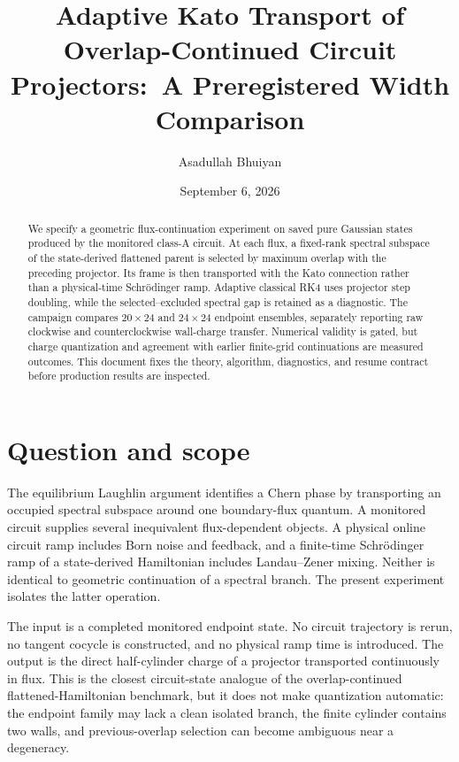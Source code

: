 \documentclass[aps,prb,twocolumn,floatfix,nofootinbib,superscriptaddress]{revtex4-2}
\begin{document}
\title{Adaptive Kato Transport of Overlap-Continued Circuit Projectors:\
A Preregistered Width Comparison}
\author{Asadullah Bhuiyan}
\date{September 6, 2026}

\begin{abstract}
We specify a geometric flux-continuation experiment on saved pure Gaussian
states produced by the monitored class-A circuit.  At each flux, a fixed-rank
spectral subspace of the state-derived flattened parent is selected by maximum
overlap with the preceding projector.  Its frame is then transported with the
Kato connection rather than a physical-time Schr\"odinger ramp.  Adaptive
classical RK4 uses projector step doubling, while the selected--excluded
spectral gap is retained as a diagnostic.  The campaign compares
$20\times24$ and $24\times24$ endpoint ensembles, separately reporting raw
clockwise and counterclockwise wall-charge transfer.  Numerical validity is
gated, but charge quantization and agreement with earlier finite-grid
continuations are measured outcomes.  This document fixes the theory,
algorithm, diagnostics, and resume contract before production results are
inspected.
\end{abstract}

\maketitle

\section{Question and scope}

The equilibrium Laughlin argument identifies a Chern phase by transporting an
occupied spectral subspace around one boundary-flux quantum.  A monitored
circuit supplies several inequivalent flux-dependent objects.  A physical
online circuit ramp includes Born noise and feedback, and a finite-time
Schr\"odinger ramp of a state-derived Hamiltonian includes Landau--Zener
mixing.  Neither is identical to geometric continuation of a spectral branch.
The present experiment isolates the latter operation.

The input is a completed monitored endpoint state.  No circuit trajectory is
rerun, no tangent cocycle is constructed, and no physical ramp time is
introduced.  The output is the direct half-cylinder charge of a projector
transported continuously in flux.  This is the closest circuit-state analogue
of the overlap-continued flattened-Hamiltonian benchmark, but it does not make
quantization automatic: the endpoint family may lack a clean isolated branch,
the finite cylinder contains two walls, and previous-overlap selection can
become ambiguous near a degeneracy.
\end{document}
